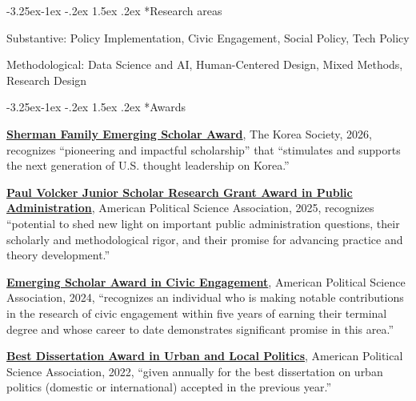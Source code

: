 \documentclass[10pt, letterpaper]{article}
\makeatletter
\renewcommand\subsection{\@startsection{subsection}{2}{\z@}%
  {-3.25ex\@plus -1ex \@minus -.2ex}%
  {1.5ex \@plus .2ex}%
  {\normalfont\large\bfseries\color{cvnavy}}}
\makeatother
\begin{document}
\subsection*{Research areas}

\begin{description}\itemsep1pt \parskip1pt
    \item Substantive: Policy Implementation, Civic Engagement, Social Policy, Tech Policy
    \item Methodological: Data Science and AI, Human-Centered Design, Mixed Methods, Research Design
\end{description}

\subsection*{Awards}
\begin{etaremune}

\item \textbf{\href{https://www.koreasociety.org/}{Sherman Family Emerging Scholar Award}}, The Korea Society, 2026, recognizes ``pioneering and impactful scholarship'' that ``stimulates and supports the next generation of U.S. thought leadership on Korea.''

\item \textbf{\href{https://apsanet.org/membership/organized-sections/organized-section-6-volcker-junior-scholar-research-grant/}{Paul Volcker Junior Scholar Research Grant Award in Public Administration}}, American Political Science Association, 2025, recognizes ``potential to shed new light on important public administration questions, their scholarly and methodological rigor, and their promise for advancing practice and theory development.''

\item \textbf{\href{https://sites.google.com/view/apsacivic/about-apsa-civic/awards?authuser=0}{Emerging Scholar Award in Civic Engagement}}, American Political Science Association, 2024, ``recognizes an individual who is making notable contributions in the research of civic engagement within five years of earning their terminal degree and whose career to date demonstrates significant promise in this area.''  

\item \textbf{\href{https://politicalsciencenow.com/congratulations-to-apsa-organized-section-award-recipients-sections-1-20/}{Best Dissertation Award in Urban and Local Politics}}, American Political Science Association, 2022, ``given annually for the best dissertation on urban politics (domestic or international) accepted in the previous year.''


\end{etaremune}
\end{document}
